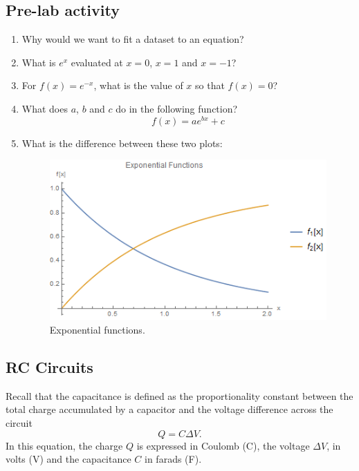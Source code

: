 \documentclass[12pt]{report}
\begin{document}
\subsection{Pre-lab activity}
\begin{enumerate}
\item Why would we want to fit a dataset to an equation?
\item What is $e^{x}$ evaluated at $x=0$, $x=1$ and $x=-1$?
\item For $f(x) = e^{-x}$, what is the value of $x$ so that $f(x)=0$?
\item What does $a$, $b$ and $c$ do in the following function?
\begin{equation}
f(x) = a e^{b x}+c
\end{equation}
\item What is the difference between these two plots:
\begin{figure}[h]
\centering
\includegraphics[width=0.8\linewidth]{lab2-prelab}
\caption{Exponential functions.}
\label{Fig:lab2-prelab}
\end{figure}
\end{enumerate}

\subsection{RC Circuits}
Recall that the capacitance is defined as the proportionality constant between the total charge accumulated by a capacitor and the voltage difference across the circuit
\begin{equation}
Q = C \Delta V.
\end{equation}
In this equation, the charge $Q$ is expressed in Coulomb (C), the voltage $\Delta V$, in volts (V) and the capacitance $C$ in farads (F).
\end{document}
